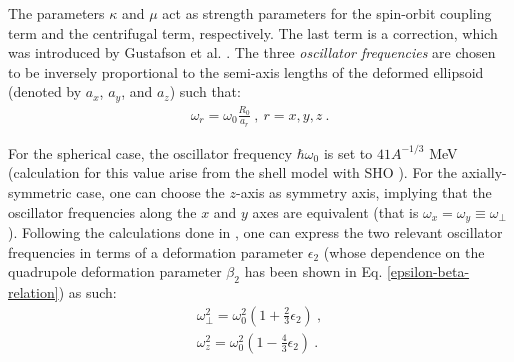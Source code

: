 The parameters $\kappa$ and $\mu$ act as strength parameters for the spin-orbit coupling term and the centrifugal term, respectively. The last term is a correction, which was introduced by Gustafson et al. \cite{gustafson1967nuclear}.
The three \emph{oscillator frequencies} are chosen to be inversely proportional to the semi-axis lengths of the deformed ellipsoid (denoted by $a_x$, $a_y$, and $a_z$) such that:
\begin{align}
    \omega_r=\omega_0\frac{R_0}{a_r}\ ,\ r=x,y,z\ .
\end{align}

For the spherical case, the oscillator frequency $\hbar\omega_0$ is set to $41A^{-1/3}$ MeV (calculation for this value arise from the shell model with SHO \cite{bertulani2007nuclear}). For the axially-symmetric case, one can choose the $z$-axis as symmetry axis, implying that the oscillator frequencies along the $x$ and $y$ axes are equivalent (that is $\omega_x=\omega_y\equiv\omega_\perp$). Following the calculations done in \cite{bertulani2007nuclear}, one can express the two relevant oscillator frequencies in terms of a deformation parameter $\epsilon_2$ (whose dependence on the quadrupole deformation parameter $\beta_2$ has been shown in Eq. \eqref{epsilon-beta-relation}) as such:
\begin{align}
    \omega_\perp^2=\omega_0^2\left(1+\frac{2}{3}\epsilon_2\right)\ ,\\
    \omega_z^2=\omega_0^2\left(1-\frac{4}{3}\epsilon_2\right)\ .
    \label{oscillator-frequencies-nilsson}
\end{align}

